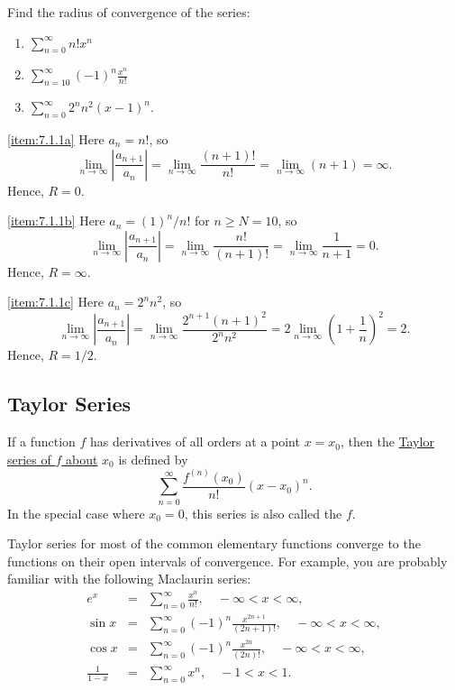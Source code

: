 \documentclass{ximera}
\begin{document}
\begin {example} \label{example:7.1.1}
 Find the radius of convergence of the series:
 \begin{enumerate}
\item\label{item:7.1.1a}
$\sum_{n=0}^\infty n!x^n$
\item\label{item:7.1.1b}
$\sum_{n=10}^\infty (-1)^n \frac{x^n}{n!}$
\item\label{item:7.1.1c}
$\sum_{n=0}^\infty 2^nn^2 (x-1)^n.$
\end{enumerate}

\begin{explanation}
\ref{item:7.1.1a}  Here $a_n=n!$, so
$$
\lim_{n\rightarrow\infty}\left|\frac{a_{n+1}}{a_n}\right|=\lim_{n\rightarrow\infty}
\frac{(n+1)!}{n!}=\lim_{n\rightarrow\infty}(n+1)=\infty.
$$
Hence, $R=0$.

\ref{item:7.1.1b}  Here $a_n=(1)^n/n!$ for $n\geq N=10$, so
$$
\lim_{n\rightarrow\infty}\left|\frac{a_{n+1}}{a_n}\right|=\lim_{n\rightarrow\infty}
\frac{n!}{(n+1)!}=\lim_{n\rightarrow\infty}\frac{1}{n+1}=0.
$$
Hence, $R=\infty$.

\ref{item:7.1.1c}  Here $a_n=2^nn^2$, so
$$
\lim_{n\rightarrow\infty}\left|\frac{a_{n+1}}{a_n}\right|=\lim_{n\rightarrow\infty}
\frac{2^{n+1}(n+1)^2}{2^nn^2}=2\lim_{n\rightarrow\infty}\left(1+\frac{1}{n}\right)^2=2.
$$
Hence, $R=1/2$.
\end{explanation}
\end{example}

\subsection*{Taylor Series}

If a function $f$ has derivatives of all orders at a point $x=x_0$,
then the
\href{https://en.wikipedia.org/wiki/Taylor_series}{Taylor series of $f$ about} $x_0$  is
defined by
$$
 \sum_{n=0}^\infty \frac{f^{(n)}(x_0)}{n!}(x-x_0)^n.
$$
In the special case where $x_0=0$, this series is also called the  $f$.

Taylor series for most of the common elementary functions converge to the functions on their open intervals of
convergence. For example, you are probably  familiar with the
following Maclaurin series:
\begin{eqnarray}
e^x&=&\sum_{n=0}^\infty \frac{x^n}{n!},\quad
-\infty<x<\infty,\label{eq:7.1.2}\\
\sin x&=&\sum_{n=0}^\infty(-1)^n \frac{x^{2n+1}}{(2n+1)!},\quad
-\infty<x<\infty, \label{eq:7.1.3}\\ %
\cos x&=&\sum_{n=0}^\infty(-1)^n \frac{x^{2n}}{(2n)!},\quad
-\infty<x<\infty, \label{eq:7.1.4}\\ %
\frac{1}{1-x}&=&\sum_{n=0}^\infty x^n,\quad-1<x<1.\label{eq:7.1.5}
\end{eqnarray}
\end{document}
